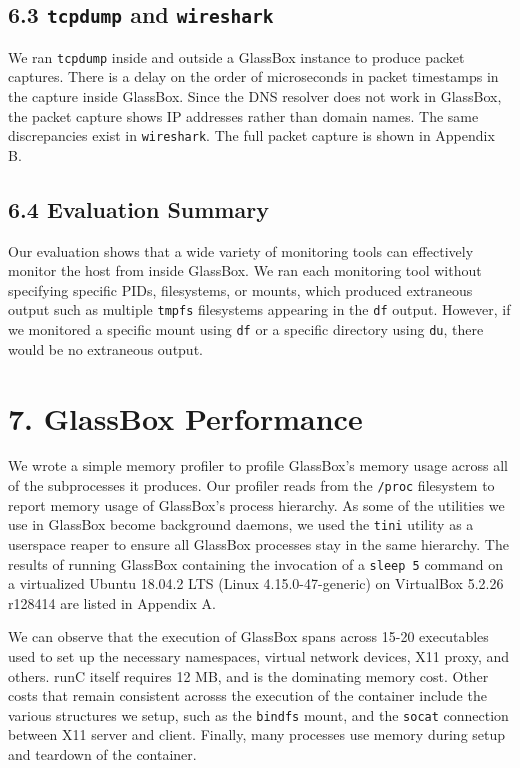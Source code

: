 \documentclass{proc}
\begin{document}
\subsection*{6.3 \texttt{tcpdump} and \texttt{wireshark}}
We ran \texttt{tcpdump} inside and outside a GlassBox instance to produce packet captures. There is a delay on the order of microseconds in packet timestamps in the capture inside GlassBox. Since the DNS resolver does not work in GlassBox, the packet capture shows IP addresses rather than domain names. The same discrepancies exist in \texttt{wireshark}. The full packet capture is shown in Appendix B.

\subsection*{6.4 Evaluation Summary}

Our evaluation shows that a wide variety of monitoring tools can effectively monitor the host from inside GlassBox. We ran each monitoring tool without specifying specific PIDs, filesystems, or mounts, which produced extraneous output such as multiple \texttt{tmpfs} filesystems appearing in the \texttt{df} output. However, if we monitored a specific mount using  \texttt{df} or a specific directory using \texttt{du}, there would be no extraneous output.

\section*{7. GlassBox Performance}

We wrote a simple memory profiler to profile GlassBox's memory usage across all of the subprocesses it produces. Our profiler reads from the \texttt{/proc} filesystem to report memory usage of GlassBox's process hierarchy. As some of the utilities we use in GlassBox become background daemons, we used the \texttt{tini} utility \cite{tinigithub} as a userspace reaper to ensure all GlassBox processes stay in the same hierarchy. The results of running GlassBox containing the invocation of a \texttt{sleep 5} command on a virtualized Ubuntu 18.04.2 LTS (Linux 4.15.0-47-generic) on VirtualBox 5.2.26 r128414 are listed in Appendix A.

We can observe that the execution of GlassBox spans across 15-20 executables used to set up the necessary namespaces, virtual network devices, X11 proxy, and others. runC itself requires 12 MB, and is the dominating memory cost. Other costs that remain consistent acrosss the execution of the container include the various structures we setup, such as the \texttt{bindfs} mount, and the \texttt{socat} connection between X11 server and client. Finally, many processes use memory during setup and teardown of the container.
\end{document}
